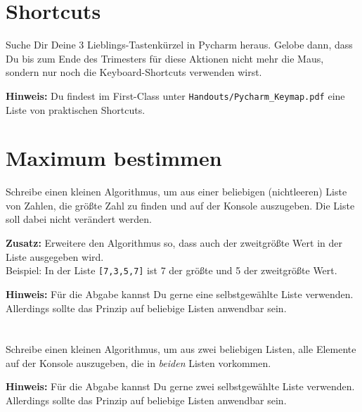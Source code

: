 \documentclass[a4paper]{article}
\begin{document}




\section{Shortcuts}
Suche Dir Deine 3 Lieblings-Tastenkürzel in Pycharm heraus. Gelobe dann, dass Du bis zum Ende des Trimesters für diese Aktionen nicht mehr die Maus, sondern nur noch die Keyboard-Shortcuts verwenden wirst. 

\vspace{2pt}

{\footnotesize\textbf{Hinweis:}
Du findest im First-Class unter \texttt{Handouts/Pycharm\_Keymap.pdf} eine Liste von praktischen Shortcuts.}


\section{Maximum bestimmen}
Schreibe einen kleinen Algorithmus, um aus einer beliebigen (nichtleeren) Liste von Zahlen, die größte Zahl zu finden und auf der Konsole auszugeben. Die Liste soll dabei nicht verändert werden.   

\vspace{2pt}

\textbf{Zusatz:} Erweitere den Algorithmus so, dass auch der zweitgrößte Wert in der Liste ausgegeben wird. \\
Beispiel: In der Liste \texttt{[7,3,5,7]} ist 7 der größte und 5 der zweitgrößte Wert. 

 \vspace{2pt}
{\footnotesize\textbf{Hinweis:} Für die Abgabe kannst Du gerne eine selbstgewählte Liste verwenden. Allerdings sollte das Prinzip auf beliebige Listen anwendbar sein.}



\section{}
Schreibe einen kleinen Algorithmus, um aus zwei beliebigen Listen, alle Elemente auf der Konsole auszugeben, die in \emph{beiden} Listen vorkommen. 
\vspace{2pt}

{\footnotesize\textbf{Hinweis:} Für die Abgabe kannst Du gerne zwei selbstgewählte Liste verwenden. Allerdings sollte das Prinzip auf beliebige Listen anwendbar sein.}
 
\end{document}

